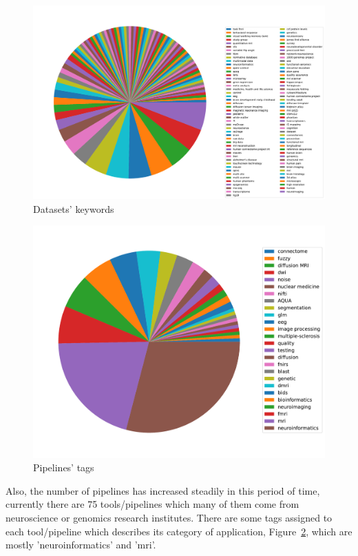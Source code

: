 \begin{figure}
    \centering
    \includegraphics[width=\textwidth,height=\textheight,keepaspectratio]{figures/Datasets Keyword Pie Chart.pdf}
    \caption{Datasets' keywords}
    \label{fig:dataset_keywords}
\end{figure}

\begin{figure}
    \centering
    \includegraphics[width=\textwidth,height=\textheight,keepaspectratio]{figures/Pipelines Tag Pie Chart.pdf}
    \caption{Pipelines' tags }
    \label{fig:pipelineTags}
\end{figure}



Also, the number of pipelines has increased steadily in this period of time, currently there are 75 tools/pipelines which many of them come from neuroscience or genomics research institutes. There are some tags assigned to each tool/pipeline which describes its category of application, Figure~\ref{fig:pipelineTags}, which are mostly 'neuroinformatics' and 'mri'.

